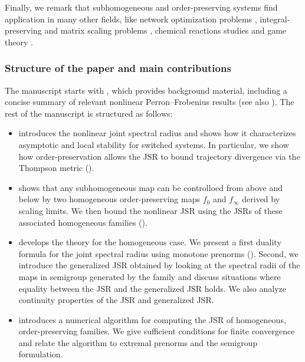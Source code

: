 \documentclass{article}
\begin{document}
Finally, we remark that subhomogeneous and order-preserving systems find application in many other fields, like network optimization problems \cite{cavalcante2019connections, CAVALCANTE2016Elementary}, integral-preserving and matrix scaling problems \cite{lemmens2012nonlinear}, chemical reactions studies \cite{angeli2008translation} and game theory \cite{akian2024competive}. 


\subsubsection*{Structure of the paper and main contributions}

The manuscript starts with , which provides background material, including a concise summary of relevant nonlinear Perron–Frobenius results (see also ). The rest of the manuscript is structured as follows:
\begin{itemize}
    \item {} introduces the nonlinear joint spectral radius and shows how it characterizes asymptotic and local stability for switched systems. In particular, we show how order-preservation allows the JSR to bound trajectory divergence via the Thompson metric ().
    
    \item {} shows that any subhomogeneous map can be controlloed from above and below by two homogeneous order-preserving maps $f_0$ and $f_\infty$ derived by scaling limits. We then bound the nonlinear JSR using the JSRs of these associated homogeneous families ().
    
    \item {} develops the theory for the homogeneous case. We present a first duality formula for the joint spectral radius using monotone prenorms (). Second, we introduce the generalized JSR obtained by looking at the spectral radii of the maps in semigroup generated by the family and discuss situations where equality between the JSR and the generalized JSR holds. We also analyze continuity properties of the JSR and generalized JSR.
    
    \item {} introduces a numerical algorithm for computing the JSR of homogeneous, order-preserving families. We give sufficient conditions for finite convergence and relate the algorithm to extremal prenorms and the semigroup formulation.
\end{itemize}
\end{document}
